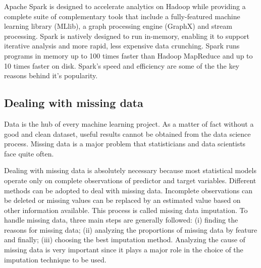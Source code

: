 \documentclass[LaM,binding=0.6cm, english]{sapthesis}
\begin{document}
\par Apache Spark is designed to accelerate analytics on Hadoop while providing a complete suite of complementary tools that include a fully-featured machine learning library (MLlib), a graph processing engine (GraphX) and stream processing. Spark is natively designed to run in-memory, enabling it to support iterative analysis and more rapid, less expensive data crunching. Spark runs programs in memory up to 100 times faster than Hadoop MapReduce and up to 10 times faster on disk. Spark's speed and efficiency are some of the the key reasons behind it's popularity. 

\subsection{Dealing with missing data} \label{missing-data}

Data is the hub of every machine learning project. As a matter of fact without a good and clean dataset, useful results cannot be obtained from the data science process. Missing data is a major problem that statisticians and data scientists face quite often.

\par Dealing with missing data is absolutely necessary because most statistical models operate only on complete observations of predictor and target variables. Different methods can be adopted to deal with missing data. Incomplete observations can be deleted or missing values can be replaced by an estimated value based on other information available. This process is called missing data imputation.\cite{Salgado2016} To handle missing data, three main steps are generally followed: (i) finding the reasons for missing data; (ii) analyzing the proportions of missing data by feature and finally; (iii) choosing the best imputation method. Analyzing the cause of missing data is very important since it plays a major role in the choice of the imputation technique to be used.

\end{document}

